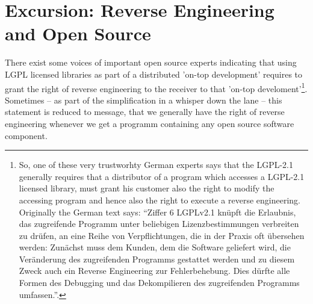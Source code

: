 %
%
%
%
%



\section{Excursion: Reverse Engineering and Open Source}

There exist some voices of important open source experts indicating that using
LGPL licensed libraries as part of a distributed 'on-top development' requires
to grant the right of reverse engineering to the receiver to that 'on-top
develoment'\footnote{So, one of these very trustworhty German experts says that
the LGPL-2.1 generally requires that a distributor of a program which accesses a
LGPL-2.1 licensed library, must grant his customer also the right to modify the
accessing program and hence also the right to execute a reverse engineering.
Originally the German text says: \enquote{Ziffer 6 LGPLv2.1 knüpft die
Erlaubnis, das zugreifende Programm unter beliebigen Lizenzbestimmungen
verbreiten zu drüfen, an eine Reihe von Verpflichtungen, die in der Praxis oft
übersehen werden: Zunächst muss dem Kunden, dem die Software geliefert wird, die
Veränderung des zugreifenden Programms gestattet werden und zu diesem Zweck auch
ein Reverse Engineering zur Fehlerbehebung. Dies dürfte alle Formen des
Debugging und das Dekompilieren des zugreifenden Programms
umfassen.}\cite[cf.][81]{JaeMet2011a}.}. Sometimes -- as part of the
simplification in a whisper down the lane -- this statement is reduced to
message, that we generally have the right of reverse engineering whenever we get
a programm containing any open source software component.

